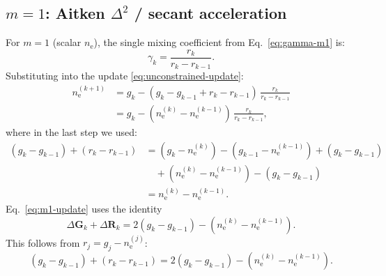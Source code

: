 \documentclass[11pt]{article}
\newcommand{\ne}{n_\mathrm{e}}
\newcommand{\DR}{\Delta\mathbf{R}}
\newcommand{\DG}{\Delta\mathbf{G}}
\begin{document}
\subsection{$m = 1$: Aitken $\Delta^2$ / secant acceleration}

For $m = 1$ (scalar $\ne$), the single mixing coefficient from
Eq.~\eqref{eq:gamma-m1} is:
%
\begin{equation}
  \gamma_k = \frac{r_k}{r_k - r_{k-1}}.
\end{equation}
%
Substituting into the update \eqref{eq:unconstrained-update}:
%
\begin{align}
  \ne^{(k+1)}
  &= g_k - (g_k - g_{k-1} + r_k - r_{k-1})\,\frac{r_k}{r_k - r_{k-1}} \nonumber\\
  &= g_k - (\ne^{(k)} - \ne^{(k-1)})\,\frac{r_k}{r_k - r_{k-1}},
  \label{eq:m1-update}
\end{align}
%
where in the last step we used:
\begin{align*}
  (g_k - g_{k-1}) + (r_k - r_{k-1})
  &= (g_k - \ne^{(k)}) - (g_{k-1} - \ne^{(k-1)}) + (g_k - g_{k-1}) \\
  &\quad + (\ne^{(k)} - \ne^{(k-1)}) - (g_k - g_{k-1}) \\
  &= \ne^{(k)} - \ne^{(k-1)}.
\end{align*}
%
%
%
%
Eq.~\eqref{eq:m1-update} uses the identity
\begin{equation}
  \DG_k + \DR_k
  = 2(g_k - g_{k-1}) - (\ne^{(k)} - \ne^{(k-1)}).
  \label{eq:dg-dr-sum}
\end{equation}
%
This follows from $r_j = g_j - \ne^{(j)}$:
\[
  (g_k - g_{k-1}) + (r_k - r_{k-1})
  = 2(g_k - g_{k-1}) - (\ne^{(k)} - \ne^{(k-1)}).
\]
\end{document}
